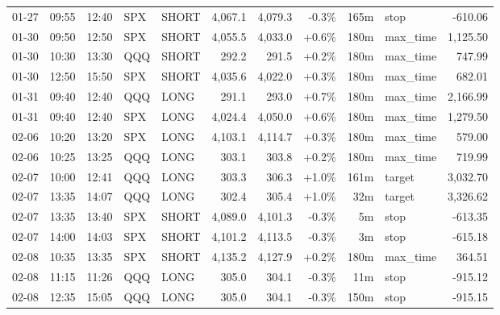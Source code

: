 \documentclass[11pt,a4paper,twoside]{article}
\begin{document}
\begin{center}
\begin{longtable}{>{\color{txtmain}}l l l l l r r r r >{\color{txtmain}}l r}
01-27 & 09:55 & 12:40 & SPX & SHORT & 4,067.1 & 4,079.3 & \textcolor{lossred}{-0.3\%} & 165m & stop & \textcolor{lossred}{-610.06} \\
01-30 & 09:50 & 12:50 & SPX & SHORT & 4,055.5 & 4,033.0 & \textcolor{wingreen}{+0.6\%} & 180m & max\_time & \textcolor{wingreen}{1,125.50} \\
01-30 & 10:30 & 13:30 & QQQ & SHORT & 292.2 & 291.5 & \textcolor{wingreen}{+0.2\%} & 180m & max\_time & \textcolor{wingreen}{747.99} \\
01-30 & 12:50 & 15:50 & SPX & SHORT & 4,035.6 & 4,022.0 & \textcolor{wingreen}{+0.3\%} & 180m & max\_time & \textcolor{wingreen}{682.01} \\
01-31 & 09:40 & 12:40 & QQQ & LONG & 291.1 & 293.0 & \textcolor{wingreen}{+0.7\%} & 180m & max\_time & \textcolor{wingreen}{2,166.99} \\
01-31 & 09:40 & 12:40 & SPX & LONG & 4,024.4 & 4,050.0 & \textcolor{wingreen}{+0.6\%} & 180m & max\_time & \textcolor{wingreen}{1,279.50} \\
02-06 & 10:20 & 13:20 & SPX & LONG & 4,103.1 & 4,114.7 & \textcolor{wingreen}{+0.3\%} & 180m & max\_time & \textcolor{wingreen}{579.00} \\
02-06 & 10:25 & 13:25 & QQQ & LONG & 303.1 & 303.8 & \textcolor{wingreen}{+0.2\%} & 180m & max\_time & \textcolor{wingreen}{719.99} \\
02-07 & 10:00 & 12:41 & QQQ & LONG & 303.3 & 306.3 & \textcolor{wingreen}{+1.0\%} & 161m & target & \textcolor{wingreen}{3,032.70} \\
02-07 & 13:35 & 14:07 & QQQ & LONG & 302.4 & 305.4 & \textcolor{wingreen}{+1.0\%} & 32m & target & \textcolor{wingreen}{3,326.62} \\
02-07 & 13:35 & 13:40 & SPX & SHORT & 4,089.0 & 4,101.3 & \textcolor{lossred}{-0.3\%} & 5m & stop & \textcolor{lossred}{-613.35} \\
02-07 & 14:00 & 14:03 & SPX & SHORT & 4,101.2 & 4,113.5 & \textcolor{lossred}{-0.3\%} & 3m & stop & \textcolor{lossred}{-615.18} \\
02-08 & 10:35 & 13:35 & SPX & SHORT & 4,135.2 & 4,127.9 & \textcolor{wingreen}{+0.2\%} & 180m & max\_time & \textcolor{wingreen}{364.51} \\
02-08 & 11:15 & 11:26 & QQQ & LONG & 305.0 & 304.1 & \textcolor{lossred}{-0.3\%} & 11m & stop & \textcolor{lossred}{-915.12} \\
02-08 & 12:35 & 15:05 & QQQ & LONG & 305.0 & 304.1 & \textcolor{lossred}{-0.3\%} & 150m & stop & \textcolor{lossred}{-915.15} \\

\end{longtable}
\end{center}
\end{document}
